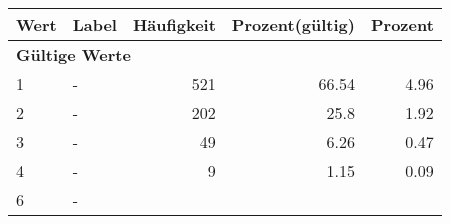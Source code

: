      \begin{longtable}{lXrrr}
     \toprule
     \textbf{Wert} & \textbf{Label} & \textbf{Häufigkeit} & \textbf{Prozent(gültig)} & \textbf{Prozent} \\
     \endhead
     \midrule
     \multicolumn{5}{l}{\textbf{Gültige Werte}}\\

     1 &
     \multicolumn{1}{X}{ -  } &


       \num{521} &
       \num[round-mode=places,round-precision=2]{66.54} &
         \num[round-mode=places,round-precision=2]{4.96} \\

     2 &
     \multicolumn{1}{X}{ -  } &


       \num{202} &
       \num[round-mode=places,round-precision=2]{25.8} &
         \num[round-mode=places,round-precision=2]{1.92} \\

     3 &
     \multicolumn{1}{X}{ -  } &


       \num{49} &
       \num[round-mode=places,round-precision=2]{6.26} &
         \num[round-mode=places,round-precision=2]{0.47} \\

     4 &
     \multicolumn{1}{X}{ -  } &


       \num{9} &
       \num[round-mode=places,round-precision=2]{1.15} &
         \num[round-mode=places,round-precision=2]{0.09} \\

     6 &
     \multicolumn{1}{X}{ -  } &



\end{longtable}
